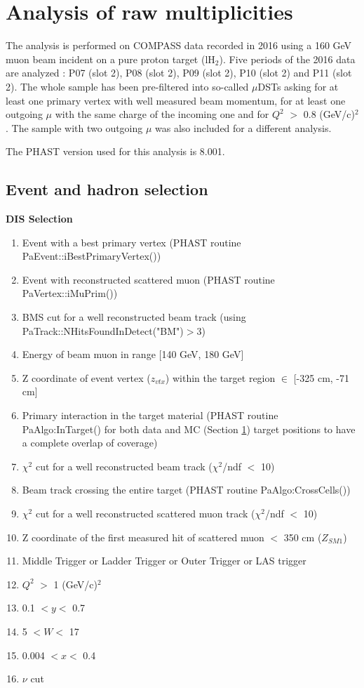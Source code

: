 \documentclass[letterpaper,12pt]{article}
\begin{document}
\section{Analysis of raw multiplicities} \label{Raw}

The analysis is performed on COMPASS data recorded in 2016 using a 160 GeV muon beam incident on a pure proton target (lH$_2$).
Five periods of the 2016 data are analyzed : P07 (slot 2), P08 (slot 2), P09 (slot 2), P10 (slot 2) and P11 (slot 2).
The whole sample has been pre-filtered into so-called $\mu$DSTs asking for at least one primary vertex with well measured beam momentum, for at least one outgoing $\mu$ with the same charge of the incoming one and for $Q^2$ $>$ 0.8 (GeV/c)$^2$. The sample with two outgoing $\mu$ was also included for a different analysis\cite{JanPt}.

The PHAST version used for this analysis is 8.001.

\subsection{Event and hadron selection}

\hfill
\newline

\textbf{DIS Selection}
\begin{enumerate}
	\item Event with a best primary vertex (PHAST routine PaEvent::iBestPrimaryVertex())
	\item Event with reconstructed scattered muon (PHAST routine PaVertex::iMuPrim())
	\item BMS cut for a well reconstructed beam track (using PaTrack::NHitsFoundInDetect("BM")$>$3)
	\item Energy of beam muon in range [140 GeV, 180 GeV]
	\item Z coordinate of event vertex ($z_{vtx}$) within the target region $\in$ [-325 cm, -71 cm]
	\item Primary interaction in the target material (PHAST routine PaAlgo:InTarget() for both data and MC (Section \ref{Raw}) target positions
				to have a complete overlap of coverage)
	\item $\chi^2$ cut for a well reconstructed beam track ($\chi^2$/ndf $<$ 10)
	\item Beam track crossing the entire target (PHAST routine PaAlgo:CrossCells())
	\item $\chi^2$ cut for a well reconstructed scattered muon track ($\chi^2$/ndf $<$ 10)
	\item Z coordinate of the first measured hit of scattered muon $<$ 350 cm ($Z_{SM1}$)
	\item Middle Trigger or Ladder Trigger or Outer Trigger or LAS trigger
	\item $Q^2$ $>$ 1 (GeV/c)$^2$
	\item 0.1 $< y <$ 0.7
	\item 5 $< W <$ 17
	\item 0.004 $< x <$ 0.4
	\item $\nu$ cut
\end{enumerate}
\end{document}

